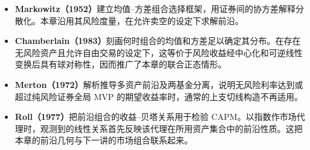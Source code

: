 \begin{tcolorbox}[knowledge,breakable=false,title={参考文献与本章贡献}]
\begin{itemize}
 \item \textbf{Markowitz（1952）}建立均值--方差组合选择框架，用证券间的协方差解释分散化。本章沿用其风险度量，在允许卖空的设定下求解前沿。
 \item \textbf{Chamberlain（1983）}刻画何时组合的均值和方差足以确定其分布。在存在无风险资产且允许自由交易的设定下，这等价于风险收益经中心化和可逆线性变换后具有球对称性，因而推广了本章的联合正态情形。
 \item \textbf{Merton（1972）}解析推导多资产前沿及两基金分离，说明无风险利率达到或超过纯风险证券全局 MVP 的期望收益率时，通常的上支切线构造不再适用。
 \item \textbf{Roll（1977）}把前沿组合的收益--贝塔关系用于检验 CAPM。以指数作市场代理时，观测到的线性关系首先反映该代理在所用资产集合中的前沿性质。这把本章的前沿几何与下一讲的市场组合联系起来。
\end{itemize}
\end{tcolorbox}
\fi

\WJChapterExercises

\endgroup
